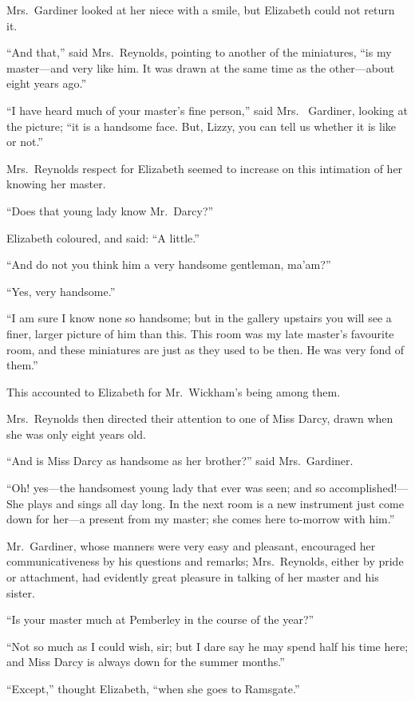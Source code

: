 Mrs.\ Gardiner looked at her niece with a smile, but Elizabeth
could not return it.

``And that,'' said Mrs.\ Reynolds, pointing to another of the
miniatures, ``is my master---and very like him.  It was drawn at
the same time as the other---about eight years ago.''

``I have heard much of your master's fine person,'' said Mrs.\ %
Gardiner, looking at the picture; ``it is a handsome face.
But, Lizzy, you can tell us whether it is like or not.''

Mrs.\ Reynolds respect for Elizabeth seemed to increase on this
intimation of her knowing her master.

``Does that young lady know Mr.\ Darcy?''

Elizabeth coloured, and said: ``A little.''

``And do not you think him a very handsome gentleman, ma'am?''

``Yes, very handsome.''

``I am sure I know none so handsome; but in the gallery
upstairs you will see a finer, larger picture of him than this.
This room was my late master's favourite room, and these
miniatures are just as they used to be then.  He was very fond
of them.''

This accounted to Elizabeth for Mr.\ Wickham's being among them.

Mrs.\ Reynolds then directed their attention to one of Miss Darcy,
drawn when she was only eight years old.

``And is Miss Darcy as handsome as her brother?'' said Mrs.\ Gardiner.

``Oh! yes---the handsomest young lady that ever was seen; and
so accomplished!---She plays and sings all day long.  In the next
room is a new instrument just come down for her---a present
from my master; she comes here to-morrow with him.''

Mr.\ Gardiner, whose manners were very easy and pleasant,
encouraged her communicativeness by his questions and remarks;
Mrs.\ Reynolds, either by pride or attachment, had evidently
great pleasure in talking of her master and his sister.

``Is your master much at Pemberley in the course of the year?''

``Not so much as I could wish, sir; but I dare say he may spend
half his time here; and Miss Darcy is always down for the
summer months.''

``Except,'' thought Elizabeth, ``when she goes to Ramsgate.''

